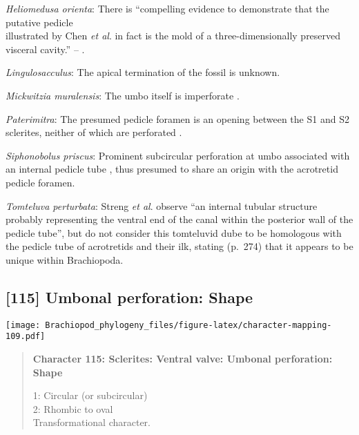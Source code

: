 \documentclass[openany]{book}
\theoremstyle{definition}
\theoremstyle{definition}
\theoremstyle{definition}
\theoremstyle{remark}
\begin{document}
\hypertarget{Heliomedusa_orienta-coding-114}{}
\emph{Heliomedusa orienta}: There is ``compelling evidence to
demonstrate that the putative pedicle\\
illustrated by Chen \emph{et al}. \citeyearpar[Figs. 4, 6,
7]{Chen2007Reinterpretationof} in fact is the mold of a
three-dimensionally preserved visceral cavity.'' --
\citet{Zhang2009Architectureand}.

\hypertarget{Lingulosacculus-coding-114}{}
\emph{Lingulosacculus}: The apical termination of the fossil is unknown.

\hypertarget{Mickwitzia_muralensis-coding-114}{}
\emph{Mickwitzia muralensis}: The umbo itself is imperforate
\citep{Balthasar2004Shellstructure}.

\hypertarget{Paterimitra-coding-114}{}
\emph{Paterimitra}: The presumed pedicle foramen is an opening between
the S1 and S2 sclerites, neither of which are perforated
\citep{Skovsted2009Thescleritome}.

\hypertarget{Siphonobolus_priscus-coding-114}{}
\emph{Siphonobolus priscus}: Prominent subcircular perforation at umbo
associated with an internal pedicle tube \citep{Popov2009Earlyontogeny},
thus presumed to share an origin with the acrotretid pedicle foramen.

\hypertarget{Tomteluva_perturbata-coding-114}{}
\emph{Tomteluva perturbata}: Streng \emph{et al}.
\citeyearpar{Streng2016Anew} observe ``an internal tubular structure
probably representing the ventral end of the canal within the posterior
wall of the pedicle tube'', but do not consider this tomteluvid dube to
be homologous with the pedicle tube of acrotretids and their ilk,
stating (p.~274) that it appears to be unique within Brachiopoda.

\subsection*{{[}115{]} Umbonal perforation:
Shape}\label{umbonal-perforation-shape}

\texttt{[image: Brachiopod\_phylogeny\_files/figure-latex/character-mapping-109.pdf]}

\begin{quote}
\textbf{Character 115: Sclerites: Ventral valve: Umbonal perforation:
Shape}

1: Circular (or subcircular)\\
2: Rhombic to oval\\
Transformational character.
\end{quote}
\end{document}
